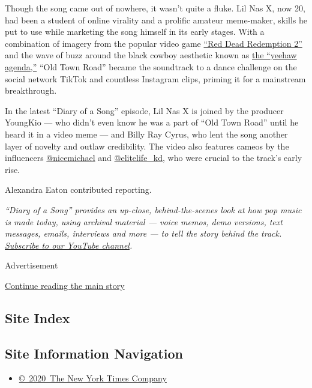 Though the song came out of nowhere, it wasn't quite a fluke. Lil Nas X,
now 20, had been a student of online virality and a prolific amateur
meme-maker, skills he put to use while marketing the song himself in its
early stages. With a combination of imagery from the popular video game
\href{https://www.youtube.com/watch?v=5ho88VXJTBg}{``Red Dead Redemption
2''} and the wave of buzz around the black cowboy aesthetic known as
\href{https://jezebel.com/what-everyone-is-getting-wrong-about-the-yee-haw-agenda-1833558033}{the
``yeehaw agenda,''} ``Old Town Road'' became the soundtrack to a dance
challenge on the social network TikTok and countless Instagram clips,
priming it for a mainstream breakthrough.

In the latest ``Diary of a Song'' episode, Lil Nas X is joined by the
producer YoungKio --- who didn't even know he was a part of ``Old Town
Road'' until he heard it in a video meme --- and Billy Ray Cyrus, who
lent the song another layer of novelty and outlaw credibility. The video
also features cameos by the influencers
\href{https://www.tiktok.com/share/user/6589585369837469702}{@nicemichael}
and
\href{https://www.instagram.com/elitelife_kd/?hl=en}{@elitelife\_kd},
who were crucial to the track's early rise.

Alexandra Eaton contributed reporting.

\emph{``Diary of a Song'' provides an up-close, behind-the-scenes look
at how pop music is made today, using archival material --- voice memos,
demo versions, text messages, emails, interviews and more --- to tell
the story behind the track.}
\href{https://www.youtube.com/playlist?list=PL4CGYNsoW2iBe_JY8XeXiUQdr2GRFgY-Z}{\emph{Subscribe
to our YouTube channel}}\emph{.}

Advertisement

\protect\hyperlink{after-bottom}{Continue reading the main story}

\hypertarget{site-index}{%
\subsection{Site Index}\label{site-index}}

\hypertarget{site-information-navigation}{%
\subsection{Site Information
Navigation}\label{site-information-navigation}}

\begin{itemize}
\tightlist
\item
  \href{https://help.nytimes3xbfgragh.onion/hc/en-us/articles/115014792127-Copyright-notice}{©~2020~The
  New York Times Company}
\end{itemize}

